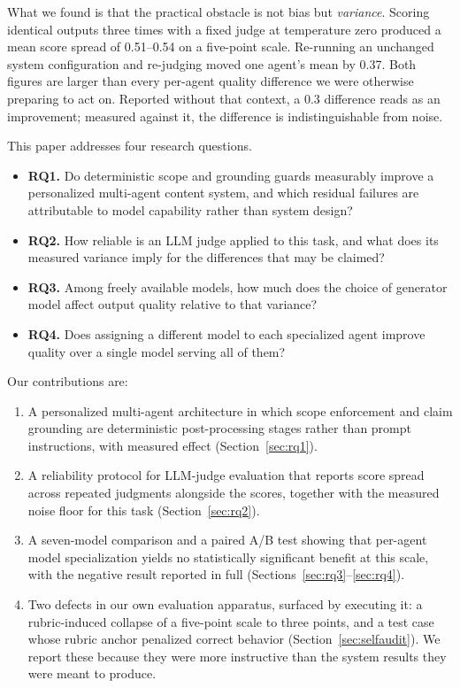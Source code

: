 \documentclass[journal]{IEEEtran}
\begin{document}
What we found is that the practical obstacle is not bias but \emph{variance}.
Scoring identical outputs three times with a fixed judge at temperature zero
produced a mean score spread of 0.51--0.54 on a five-point scale. Re-running an
unchanged system configuration and re-judging moved one agent's mean by 0.37.
Both figures are larger than every per-agent quality difference we were
otherwise preparing to act on. Reported without that context, a 0.3 difference
reads as an improvement; measured against it, the difference is
indistinguishable from noise.

This paper addresses four research questions.

\begin{itemize}
\item \textbf{RQ1.} Do deterministic scope and grounding guards measurably
      improve a personalized multi-agent content system, and which residual
      failures are attributable to model capability rather than system design?
\item \textbf{RQ2.} How reliable is an LLM judge applied to this task, and what
      does its measured variance imply for the differences that may be claimed?
\item \textbf{RQ3.} Among freely available models, how much does the choice of
      generator model affect output quality relative to that variance?
\item \textbf{RQ4.} Does assigning a different model to each specialized agent
      improve quality over a single model serving all of them?
\end{itemize}

Our contributions are:

\begin{enumerate}
\item A personalized multi-agent architecture in which scope enforcement and
      claim grounding are deterministic post-processing stages rather than
      prompt instructions, with measured effect (Section~\ref{sec:rq1}).
\item A reliability protocol for LLM-judge evaluation that reports score spread
      across repeated judgments alongside the scores, together with the
      measured noise floor for this task (Section~\ref{sec:rq2}).
\item A seven-model comparison and a paired A/B test showing that per-agent
      model specialization yields no statistically significant benefit at this
      scale, with the negative result reported in full
      (Sections~\ref{sec:rq3}--\ref{sec:rq4}).
\item Two defects in our own evaluation apparatus, surfaced by executing it: a
      rubric-induced collapse of a five-point scale to three points, and a test
      case whose rubric anchor penalized correct behavior
      (Section~\ref{sec:selfaudit}). We report these because they were more
      instructive than the system results they were meant to produce.
\end{enumerate}
\end{document}
